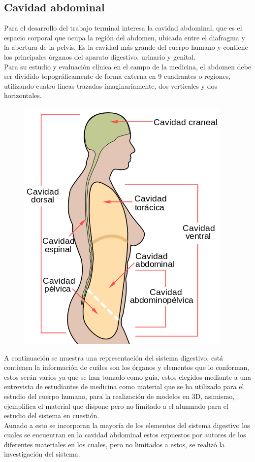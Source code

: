 \subsection{Cavidad abdominal}
Para el desarrollo del trabajo terminal interesa la cavidad abdominal, que es el espacio corporal que ocupa la región del abdomen, ubicada entre el diafragma y la 
abertura de la pelvis. Es la cavidad más grande del cuerpo humano y contiene los principales órganos del aparato digestivo, urinario y genital.\\
Para su estudio y evaluación clínica en el campo de la medicina, el abdomen debe ser dividido topográficamente de forma externa en 9 cuadrantes o regiones, 
utilizando cuatro líneas trazadas imaginariamente, dos verticales y dos horizontales.\cite{web12}\\
\begin{figure}[H]
	\begin{center}
 		\includegraphics[width = .3\textwidth]{source/images/image56.png}
	\end{center} 
\end{figure}
A continuación se muestra una representación del sistema digestivo, está contienen la información de cuáles son los órganos y elementos que lo conforman, estos serán 
varios ya que se han tomado como guía, estos elegidos mediante a una entrevista de estudiantes de medicina como material que se ha utilizado para el estudio del cuerpo 
humano, para la realización de modelos en 3D, asimismo, ejemplifica el material que dispone pero no limitado a el alumnado para el estudio del sistema en cuestión.\\
Aunado a esto se incorporan la mayoría de los elementos del sistema digestivo los cuales se encuentran en la cavidad abdominal estos expuestos por autores de los 
diferentes materiales en los cuales, pero no limitados a estos, se realizó la investigación del sistema.\\
